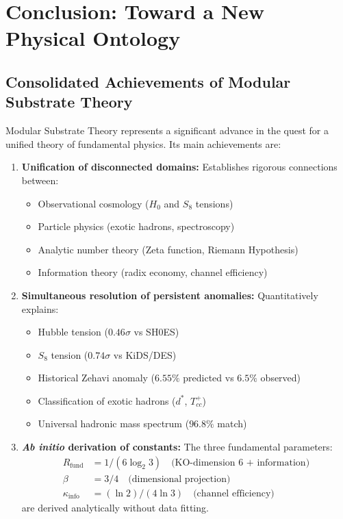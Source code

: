 \documentclass[11pt, a4paper]{article}
\theoremstyle{plain}
\theoremstyle{definition}
\newcommand{\Rfactor}{R_{\text{fund}}}
\newcommand{\Kinfo}{\kappa_{\text{info}}}
\begin{document}
\section{Conclusion: Toward a New Physical Ontology}
\label{sec:conclusion}

\subsection{Consolidated Achievements of Modular Substrate Theory}

Modular Substrate Theory represents a significant advance in the quest for a unified theory of fundamental physics. Its main achievements are:

\begin{enumerate}
    \item \textbf{Unification of disconnected domains:} Establishes rigorous connections between:
    \begin{itemize}
        \item Observational cosmology ($H_0$ and $S_8$ tensions)
        \item Particle physics (exotic hadrons, spectroscopy)
        \item Analytic number theory (Zeta function, Riemann Hypothesis)
        \item Information theory (radix economy, channel efficiency)
    \end{itemize}
    
    \item \textbf{Simultaneous resolution of persistent anomalies:} Quantitatively explains:
    \begin{itemize}
        \item Hubble tension ($0.46\sigma$ vs SH0ES)
        \item $S_8$ tension ($0.74\sigma$ vs KiDS/DES)
        \item Historical Zehavi anomaly ($6.55\%$ predicted vs $6.5\%$ observed)
        \item Classification of exotic hadrons ($d^*$, $T_{cc}^+$)
        \item Universal hadronic mass spectrum ($96.8\%$ match)
    \end{itemize}
    
    \item \textbf{\textit{Ab initio} derivation of constants:} The three fundamental parameters:
    \begin{align*}
        \Rfactor &= 1/(6\log_2 3) \quad \text{(KO-dimension 6 + information)} \\
        \beta &= 3/4 \quad \text{(dimensional projection)} \\
        \Kinfo &= (\ln 2)/(4\ln 3) \quad \text{(channel efficiency)}
    \end{align*}
    are derived analytically without data fitting.
    

\end{enumerate}
\end{document}
